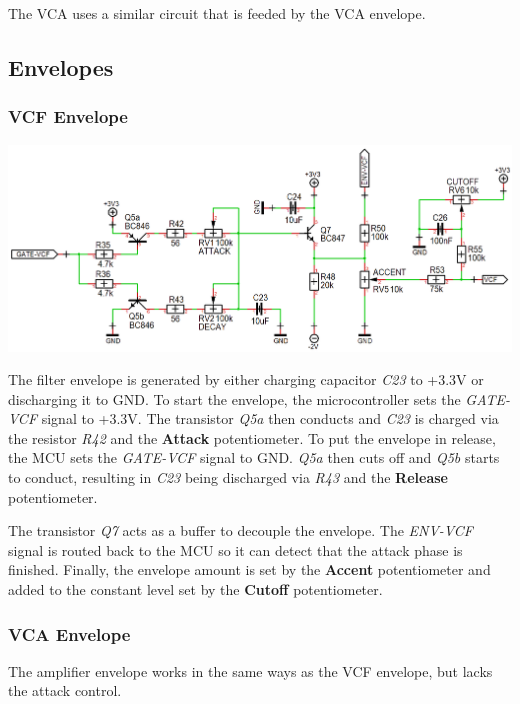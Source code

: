 \documentclass{scrartcl}
\begin{document}
The VCA uses a similar circuit that is feeded by the VCA envelope.

\subsection{Envelopes}

\subsubsection{VCF Envelope}

\begin{center}
    \includegraphics[scale=0.36]{assets/schema-ar.png}
\end{center}

The filter envelope is generated by either charging capacitor \emph{C23} to +3.3V or discharging it to GND. To start the envelope, the microcontroller sets the \emph{GATE-VCF} signal to +3.3V. The transistor \emph{Q5a} then conducts and \emph{C23} is charged via the resistor \emph{R42} and the \textbf{Attack} potentiometer. To put the envelope in release, the MCU sets the \emph{GATE-VCF} signal to GND. \emph{Q5a} then cuts off and \emph{Q5b} starts to conduct, resulting in \emph{C23} being discharged via \emph{R43} and the \textbf{Release} potentiometer.

The transistor \emph{Q7} acts as a buffer to decouple the envelope. The \emph{ENV-VCF} signal is routed back to the MCU so it can detect that the attack phase is finished. Finally, the envelope amount is set by the \textbf{Accent} potentiometer and added to the constant level set by the \textbf{Cutoff} potentiometer.

\subsubsection{VCA Envelope}

The amplifier envelope works in the same ways as the VCF envelope, but lacks the attack control.
\end{document}
